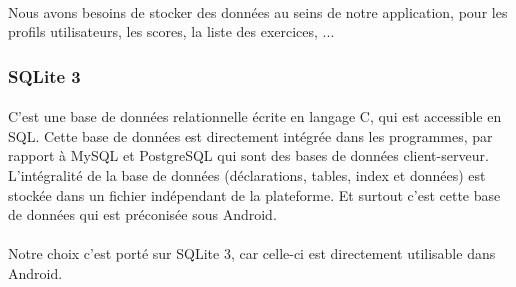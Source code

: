 \paragraph{}Nous avons besoins de stocker des données au seins de notre application, pour les profils utilisateurs, les scores, la liste des exercices, ...

\subsubsection{SQLite 3}
\paragraph{}C'est une base de données relationnelle écrite en langage C, qui est accessible en SQL. Cette base de données est directement intégrée dans les programmes, par rapport à MySQL et PostgreSQL qui sont des bases de données client-serveur. L'intégralité de la base de données (déclarations, tables, index et données) est stockée dans un fichier indépendant de la plateforme. Et surtout c'est cette base de données qui est préconisée sous Android.
\paragraph{}Notre choix c'est porté sur SQLite 3, car celle-ci est directement utilisable dans Android.

